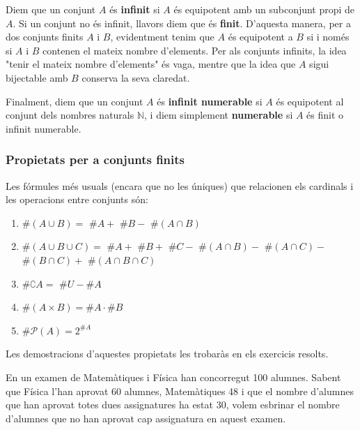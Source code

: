 Diem que un conjunt $A$ és \textbf{infinit} si $A$ és equipotent amb
un subconjunt propi de $A$. Si un conjunt no és infinit, llavors diem
que és \textbf{finit}. D'aquesta manera, per a dos conjunts finits $A$ i
$B$, evidentment tenim que $A$ és equipotent a $B$ si i només si $A$
i $B$ contenen el mateix nombre d'elements. Per als conjunts infinits, la
idea "tenir el mateix nombre d'elements" és vaga, mentre que la idea que
$A$ sigui bijectable amb $B$ conserva la seva claredat.

\bigskip

Finalment, diem que un conjunt $A$ és \textbf{infinit numerable} si $A$
és equipotent al conjunt dels nombres naturals $\mathbb{N}$, i diem
simplement \textbf{numerable} si $A$ és finit o infinit numerable.

\subsubsection{Propietats per a conjunts finits}

Les fórmules més usuals (encara que no les úniques) que
relacionen els cardinals i les operacions entre conjunts són:

\begin{enumerate}
\item $\#\left( A\cup B\right) =$ $\#A+$ $\#B-$ $\#\left( A\cap B\right) $

\item $\#\left( A\cup B\cup C\right) =$ $\#A+$ $\#B+$ $\#C-$ $\#\left( A\cap
B\right) -$ $\#\left( A\cap C\right) -$ $\#\left( B\cap C\right) +$ $%
\#\left( A\cap B\cap C\right) $

\item $\#\complement A=$ $\#U-\#A$

\item $\#\left( A\times B\right) =\#A\cdot\#B$

\item $\#\mathcal{P}(A)=2^{\#A}$
\end{enumerate}

Les demostracions d'aquestes propietats les trobaràs en els exercicis
resolts.

\begin{exemple}
En un examen de Matemàtiques i Física han concorregut 100 alumnes.
Sabent que Física l'han aprovat 60 alumnes, Matemàtiques 48 i que
el nombre d'alumnes que han aprovat totes dues assignatures ha estat 30,
volem esbrinar el nombre d'alumnes que no han aprovat cap assignatura en
aquest examen.
\end{exemple}


